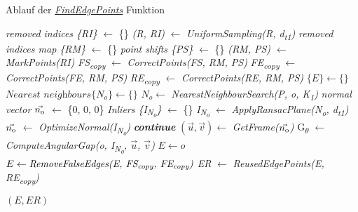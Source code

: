 \begin{algorithm}
	\caption{Ablauf der \textit{\hyperref[alg:find_edge_points]{FindEdgePoints}} Funktion}
	\label{alg:find_edge_points}
	\begin{algorithmic}[1]
		\State \textit{removed indices \{RI\}} $\gets$ \{\}
		\State \textit{(R, RI)} $\gets$ \textit{UniformSampling(R, d\textsubscript{t1})}
		\State \textit{removed indices map \{RM\}} $\gets$ \{\}
		\State \textit{point shifts \{PS\}} $\gets$ \{\}
		\State \textit{(RM, PS)} $\gets$ \textit{MarkPoints(RI)}
		\State \textit{FS\textsubscript{copy}} $\gets$ \textit{CorrectPoints(FS, RM, PS)}
		\State \textit{FE\textsubscript{copy}} $\gets$ \textit{CorrectPoints(FE, RM, PS)}
		\State \textit{RE\textsubscript{copy}} $\gets$ \textit{CorrectPoints(RE, RM, PS)}
		\State $\{E\} \gets \{\}$
		\State $\textit{Nearest neighbours} \{N_o\} \gets \{\}$
		\State $N_o \gets$ \textit{NearestNeighbourSearch(P, o, K\textsubscript{1})}
		\State \textit{normal vector $\vec{n\textsubscript{o}}$} $\gets$ \{0, 0, 0\}
		\State \textit{Inliers \{I\textsubscript{N\textsubscript{o}}\}} $\gets$ \{\}
		\State \textit{I\textsubscript{N\textsubscript{o}}} $\gets$ \textit{ApplyRansacPlane(N\textsubscript{o}, d\textsubscript{t1})}
		\State $\vec{n\textsubscript{o}}$ $\gets$ \textit{OptimizeNormal(I\textsubscript{N\textsubscript{o}})}
		\State \textit{\textbf{continue}}
		\EndIf
		\State $(\vec{u}, \vec{v}) \gets$ \textit{GetFrame($\vec{n\textsubscript{o}}$)}
		\State G\textsubscript{$\theta$} $\gets$ \textit{ComputeAngularGap(o, I\textsubscript{N\textsubscript{o}}, $\vec{u}$, $\vec{v}$)}
		\State $E \gets o$
		\EndIf
		\EndFor
		\State $E \gets \textit{RemoveFalseEdges(E, FS\textsubscript{copy}, FE\textsubscript{copy})}$
		\State \textit{ER} $\gets$ \textit{ReusedEdgePoints(E, RE\textsubscript{copy})}
		
		\State \Return $(E, ER)$
		\EndFunction
	\end{algorithmic}
\end{algorithm}

